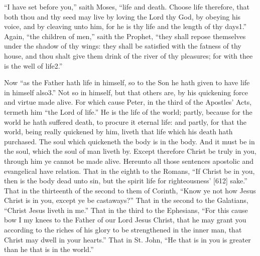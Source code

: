 “I have set before you,” saith Moses, “life and death. Choose life therefore, that both thou and thy seed may live by loving the Lord thy God, by obeying his voice, and by cleaving unto him, for he is thy life and the length of thy days1.” Again, “the children of men,” saith the Prophet, “they shall repose themselves under the shadow of thy wings: they shall be satisfied with the fatness of thy house, and thou shalt give them drink of the river of thy pleasures; for with thee is the well of life2.”

Now “as the Father hath life in himself, so to the Son he hath given to have life in himself also3.” Not so in himself, but that others are, by his quickening force and virtue made alive. For which cause Peter, in the third of the Apostles’ Acts, termeth him “the Lord of life.” He is the life of the world; partly, because for the world he hath suffered death, to procure it eternal life: and partly, for that the world, being really quickened by him, liveth that life which his death hath purchased. The soul which quickeneth the body is in the body. And it must be in the soul, which the soul of man liveth by. Except therefore Christ be truly in you, through him ye cannot be made alive. Hereunto all those sentences apostolic and evangelical have relation. That in the eighth to the Romans, “If Christ be in you, then is the body dead unto sin, but the spirit life for righteousness’ [612] sake.” That in the thirteenth of the second to them of Corinth, “Know ye not how Jesus Christ is in you, except ye be castaways?” That in the second to the Galatians, “Christ Jesus liveth in me.” That in the third to the Ephesians, “For this cause bow I my knees to the Father of our Lord Jesus Christ, that he may grant you according to the riches of his glory to be strengthened in the inner man, that Christ may dwell in your hearts.” That in St. John, “He that is in you is greater than he that is in the world.”

